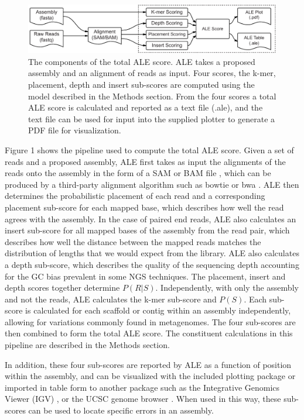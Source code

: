\documentclass[phd,tocprelim]{cornell}
\begin{document}
\begin{figure}[!tpb]%
    \centerline{\includegraphics[width=\textwidth]{figures/ALE/Clark_Fig1c.pdf}}
    \caption[Components of the ALE score]{The components of the total ALE score. ALE takes a proposed assembly and an alignment of reads as input. Four scores, the k-mer, placement, depth and insert sub-scores are computed using the model described in the Methods section. From the four scores a total ALE score is calculated and reported as a text file (.ale), and the text file can be used for input into the supplied plotter to generate a PDF file for visualization.}\label{fig:01}
\end{figure}

Figure 1 shows the pipeline used to compute the total ALE score. Given a set of reads and a proposed assembly, ALE first takes as input the alignments of the reads onto the assembly in the form of a SAM or BAM file \cite{Li2009}, which can be produced by a third-party alignment algorithm such as bowtie \cite{Langmead2009} or bwa \cite{Li2009}. ALE then determines the probabilistic placement of each read and a corresponding placement sub-score for each mapped base, which describes how well the read agrees with the assembly.  In the case of paired end reads, ALE also calculates an insert sub-score for all mapped bases of the assembly from the read pair, which describes how well the distance between the mapped reads matches the distribution of lengths that we would expect from the library.  ALE also calculates a depth sub-score, which describes the quality of the sequencing depth accounting for the GC bias prevalent in some NGS techniques.  The placement, insert and depth scores together determine $P(R|S)$.  Independently, with only the assembly and not the reads, ALE calculates the k-mer sub-score and $P(S)$. Each sub-score is calculated for each scaffold or contig within an assembly independently, allowing for variations commonly found in metagenomes. The four sub-scores are then combined to form the total ALE score. The constituent calculations in this pipeline are described in the Methods section.

In addition, these four sub-scores are reported by ALE as a function of position within the assembly, and can be visualized with the included plotting package or imported in table form to another package such as the Integrative Genomics Viewer (IGV) \cite{Nicol2009}, or the UCSC genome browser \cite{Kent2002}.  When used in this way, these sub-scores can be used to locate specific errors in an assembly. 
\end{document}

